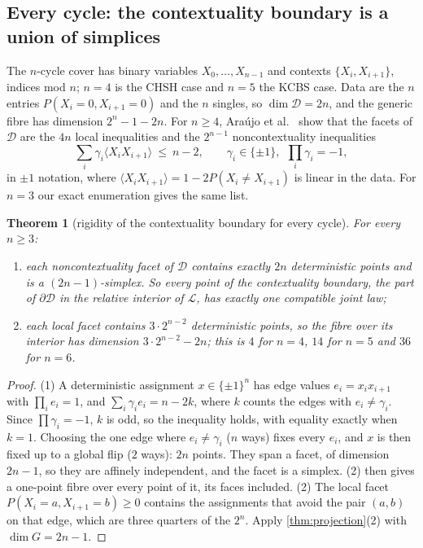 \documentclass[11pt]{article}
\newtheorem{theorem}{Theorem}\newtheorem{proposition}[theorem]{Proposition}\newtheorem{lemma}[theorem]{Lemma}\newtheorem{corollary}[theorem]{Corollary}\newtheorem{conjecture}[theorem]{Conjecture}\crefname{conjecture}{Conjecture}{Conjectures}
\theoremstyle{definition}\newtheorem{definition}[theorem]{Definition}\newtheorem{remark}[theorem]{Remark}\newtheorem{example}[theorem]{Example}\newtheorem{problem}[theorem]{Open problem}\crefname{problem}{Problem}{Problems}
\begin{document}
\subsection{Every cycle: the contextuality boundary is a union of simplices}\label{sec:ncycle}
The $n$-cycle cover has binary variables $X_0,\dots,X_{n-1}$ and contexts $\{X_i,X_{i+1}\}$, indices mod $n$; $n=4$ is the CHSH case and $n=5$ the KCBS case. Data are the $n$ entries $P(X_i=0,X_{i+1}=0)$ and the $n$ singles, so $\dim\mathcal D=2n$, and the generic fibre has dimension $2^n-1-2n$. For $n\ge4$, Ara\'ujo et al.\ \cite{AraujoEtAl2013} show that the facets of $\mathcal D$ are the $4n$ local inequalities and the $2^{n-1}$ noncontextuality inequalities
\[
\textstyle\sum_{i}\gamma_i\langle X_iX_{i+1}\rangle\ \le\ n-2,\qquad\gamma_i\in\{\pm1\},\ \ \prod_i\gamma_i=-1,
\]
in $\pm1$ notation, where $\langle X_iX_{i+1}\rangle=1-2P(X_i\ne X_{i+1})$ is linear in the data. For $n=3$ our exact enumeration gives the same list.

\begin{theorem}[rigidity of the contextuality boundary for every cycle]\label{thm:ncycle}
For every $n\ge3$:
\begin{enumerate}
\item[(1)] each noncontextuality facet of $\mathcal D$ contains exactly $2n$ deterministic points and is a $(2n-1)$-simplex. So every point of the contextuality boundary, the part of $\partial\mathcal D$ in the relative interior of $\mathcal L$, has exactly one compatible joint law;
\item[(2)] each local facet contains $3\cdot2^{n-2}$ deterministic points, so the fibre over its interior has dimension $3\cdot2^{n-2}-2n$; this is $4$ for $n=4$, $14$ for $n=5$ and $36$ for $n=6$.
\end{enumerate}
\end{theorem}

\begin{proof}
(1) A deterministic assignment $x\in\{\pm1\}^n$ has edge values $e_i=x_ix_{i+1}$ with $\prod_ie_i=1$, and $\sum_i\gamma_ie_i=n-2k$, where $k$ counts the edges with $e_i\ne\gamma_i$. Since $\prod\gamma_i=-1$, $k$ is odd, so the inequality holds, with equality exactly when $k=1$. Choosing the one edge where $e_i\ne\gamma_i$ ($n$ ways) fixes every $e_i$, and $x$ is then fixed up to a global flip ($2$ ways): $2n$ points. They span a facet, of dimension $2n-1$, so they are affinely independent, and the facet is a simplex. (2) then gives a one-point fibre over every point of it, its faces included. (2) The local facet $P(X_i=a,X_{i+1}=b)\ge0$ contains the assignments that avoid the pair $(a,b)$ on that edge, which are three quarters of the $2^n$. Apply \cref{thm:projection}(2) with $\dim G=2n-1$.
\end{proof}
\end{document}
